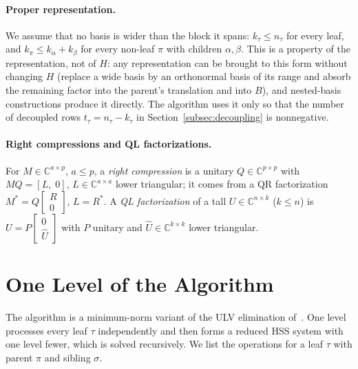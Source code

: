 \paragraph{Proper representation.} We assume that no basis is wider than the block it spans:
$k_\tau\le n_\tau$ for every leaf, and $k_\pi\le k_\alpha+k_\beta$ for every non-leaf $\pi$ with children
$\alpha,\beta$. This is a property of the representation, not of $H$: any representation can be
brought to this form without changing $H$ (replace a wide basis by an orthonormal basis of its
range and absorb the remaining factor into the parent's translation and into $B$), and
nested-basis constructions produce it directly. The algorithm uses it only so that the number of
decoupled rows $t_\tau=n_\tau-k_\tau$ in Section~\ref{subsec:decoupling} is nonnegative.

\paragraph{Right compressions and QL factorizations.} For $M\in\mathbb{C}^{a\times p}$, $a\le p$, a
\emph{right compression} is a unitary $Q\in\mathbb{C}^{p\times p}$ with $MQ=[L,\;0]$,
$L\in\mathbb{C}^{a\times a}$ lower triangular; it comes from a QR factorization
$M^*=Q\begin{bmatrix}R\\0\end{bmatrix}$, $L=R^*$. A \emph{QL factorization} of a tall
$U\in\mathbb{C}^{n\times k}$ ($k\le n$) is $U=P\begin{bmatrix}0\\ \hat U\end{bmatrix}$ with $P$ unitary
and $\hat U\in\mathbb{C}^{k\times k}$ lower triangular.

\section{One Level of the Algorithm}
\label{sec:algorithm}

The algorithm is a minimum-norm variant of the ULV elimination of~\cite{cgp}. One level processes
every leaf $\tau$ independently and then forms a reduced HSS system with one level fewer, which is
solved recursively. We list the operations for a leaf $\tau$ with parent $\pi$ and sibling $\sigma$.

